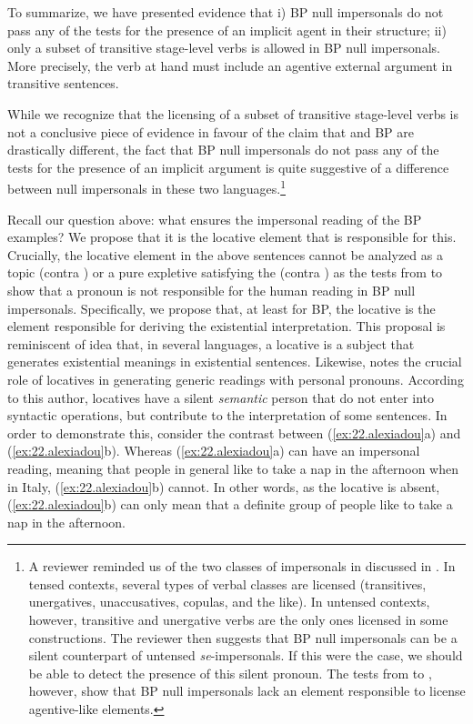 \documentclass[output=paper]{LSP/langsci}
\begin{document}
\newpage 
To summarize, we have presented evidence that i) BP null impersonals do not pass any of the tests for the presence of an implicit agent in their structure; ii) only a subset of transitive stage-level verbs is allowed in BP null impersonals. More precisely, the verb at hand must include an agentive external argument in transitive sentences.

While we recognize that the licensing of a subset of transitive stage-level verbs is not a conclusive piece of evidence in favour of the claim that  and BP are drastically different, the fact that BP null impersonals do not pass any of the tests for the presence of an implicit argument is quite suggestive of a difference between null impersonals in these two languages.\footnote{\label{fn:alexiadou:11}A reviewer reminded us of the two classes of impersonals in  discussed in \citet{Cinque1988}. In tensed contexts, several types of verbal classes are licensed (transitives, unergatives, unaccusatives, copulas, and the like). In untensed contexts, however, transitive and unergative verbs are the only ones licensed in some constructions. The reviewer then suggests that BP null impersonals can be a silent counterpart of untensed  \textit{se}-impersonals. If this were the case, we should be able to detect the presence of this silent pronoun. The tests from  to , however, show that BP null impersonals lack an element responsible to license agentive-like elements.}

\largerpage[-2]%
Recall our question above: what ensures the impersonal reading of the BP examples? We propose that it is the locative element that is responsible for this. Crucially, the locative element in the above sentences  cannot be analyzed as a topic (contra \citealt{Barbosa2011,Barbosatoappear}) or a pure expletive satisfying the  (contra \citealt{Buthers2009,AvelarEtAl2008}) as the tests from  to  show that a pronoun is not responsible for the human reading in BP null impersonals. Specifically, we propose that, at least for BP, the locative is the element responsible for deriving the existential interpretation. This proposal is reminiscent of  idea that, in several languages, a locative is a subject that generates existential meanings in existential sentences. Likewise, \citet{Brody2013} notes the crucial role of locatives in generating generic readings with personal pronouns. According to this author, locatives have a silent \textit{semantic} person that do not enter into syntactic operations, but contribute to the  interpretation of some sentences. In order to demonstrate this, consider the contrast between (\ref{ex:22.alexiadou}a) and (\ref{ex:22.alexiadou}b). Whereas (\ref{ex:22.alexiadou}a) can have an impersonal reading, meaning that people in general like to take a nap in the afternoon when in Italy, (\ref{ex:22.alexiadou}b) cannot. In other words, as the locative is absent, (\ref{ex:22.alexiadou}b) can only mean that a definite group of people like to take a nap in the afternoon.
\end{document}
